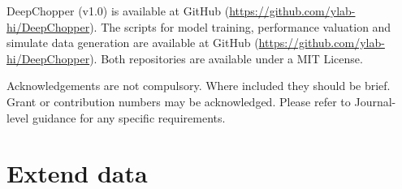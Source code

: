 \documentclass[pdflatex, sn-mathphys-num, lineno]{sn-jnl}%
\theoremstyle{thmstyleone}%
\theoremstyle{thmstyletwo}%
\theoremstyle{thmstylethree}%
\begin{document}

DeepChopper (v1.0) is available at GitHub (\url{https://github.com/ylab-hi/DeepChopper}).
The scripts for model training, performance valuation and simulate data generation are available at GitHub (\url{https://github.com/ylab-hi/DeepChopper}).
Both repositories are available under a MIT License.


Acknowledgements are not compulsory. Where included they should be brief. Grant or contribution numbers may be acknowledged.
Please refer to Journal-level guidance for any specific requirements.


\backmatter

\begin{appendices}
	\printglossaries[type=\acronymtype, title=Abbreviations]
\end{appendices}






\newpage

\section{Extend data}

\renewcommand{\figurename}{Extended Data Fig.}
\end{document}

